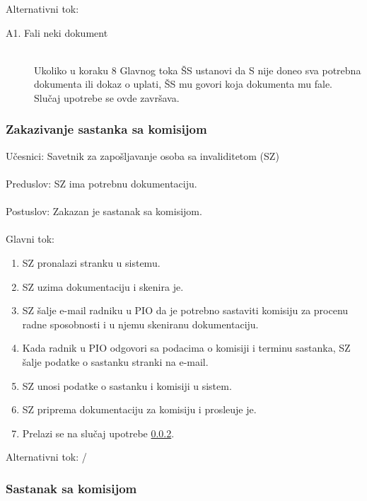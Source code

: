 \noindent Alternativni tok:
\begin{description}
	\item[A1. Fali neki dokument] ~\\
	Ukoliko u koraku 8 Glavnog toka \v SS ustanovi da S nije doneo sva potrebna dokumenta ili dokaz o uplati, \v SS mu govori koja dokumenta mu fale. Slu\v caj upotrebe se ovde zavr\v sava.
\end{description}

\subsubsection{Zakazivanje sastanka sa komisijom}

\label{su: zakazivanje sastanka}

\noindent U\v cesnici: Savetnik za zapo\v sljavanje osoba sa invaliditetom (SZ)
\\
\\ Preduslov: SZ ima potrebnu dokumentaciju.
\\
\\ Postuslov: Zakazan je sastanak sa komisijom.
\\
\\ Glavni tok:
\begin{enumerate}
	\item SZ pronalazi stranku u sistemu.
	\item SZ uzima dokumentaciju i skenira je.
	\item SZ \v salje e-mail radniku u PIO da je potrebno sastaviti komisiju za procenu radne sposobnosti i u njemu skeniranu dokumentaciju.
	\item Kada radnik u PIO odgovori sa podacima o komisiji i terminu sastanka, SZ \v salje podatke o sastanku stranki na e-mail.
	\item SZ unosi podatke o sastanku i komisiji u sistem.
	\item SZ priprema dokumentaciju za komisiju i prosle\dj uje je.
	\item Prelazi se na slu\v caj upotrebe \ref{su: sastanak}.
\end{enumerate}

\noindent Alternativni tok: /


\subsubsection{Sastanak sa komisijom}

\label{su: sastanak}

